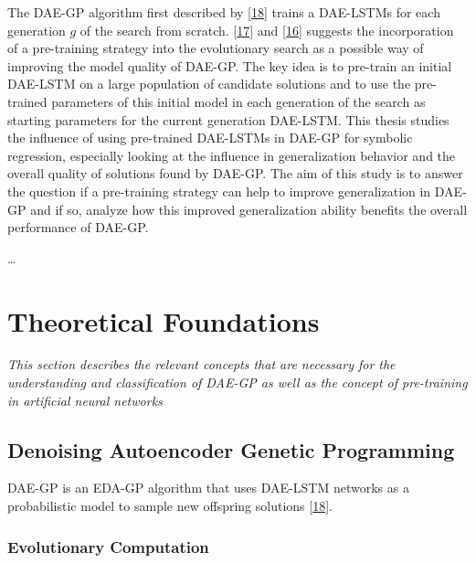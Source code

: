 \documentclass[
  11pt,
]{article}
\begin{document}
The DAE-GP algorithm first described by
{[}\protect\hyperlink{ref-dae-gp_2020_rtree}{18}{]} trains a DAE-LSTMs
for each generation \(g\) of the search from scratch.
{[}\protect\hyperlink{ref-dae-gp_2022_symreg}{17}{]} and
{[}\protect\hyperlink{ref-daegp_explore_exploit}{16}{]} suggests the
incorporation of a pre-training strategy into the evolutionary search as
a possible way of improving the model quality of DAE-GP. The key idea is
to pre-train an initial DAE-LSTM on a large population of candidate
solutions and to use the pre-trained parameters of this initial model in
each generation of the search as starting parameters for the current
generation DAE-LSTM. This thesis studies the influence of using
pre-trained DAE-LSTMs in DAE-GP for symbolic regression, especially
looking at the influence in generalization behavior and the overall
quality of solutions found by DAE-GP. The aim of this study is to answer
the question if a pre-training strategy can help to improve
generalization in DAE-GP and if so, analyze how this improved
generalization ability benefits the overall performance of DAE-GP.

\ldots{}

\hypertarget{theoretical-foundations}{%
\section{Theoretical Foundations}\label{theoretical-foundations}}

\emph{This section describes the relevant concepts that are necessary
for the understanding and classification of DAE-GP as well as the
concept of pre-training in artificial neural networks}

\hypertarget{denoising-autoencoder-genetic-programming}{%
\subsection{Denoising Autoencoder Genetic
Programming}\label{denoising-autoencoder-genetic-programming}}

DAE-GP is an EDA-GP algorithm that uses DAE-LSTM networks as a
probabilistic model to sample new offspring solutions
{[}\protect\hyperlink{ref-dae-gp_2020_rtree}{18}{]}.

\hypertarget{evolutionary-computation}{%
\subsubsection{Evolutionary
Computation}\label{evolutionary-computation}}
\end{document}
